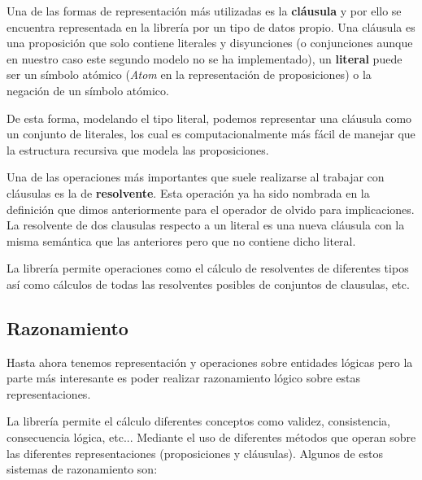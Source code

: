 	Una de las formas de representación más utilizadas es la \textbf{cláusula} y por ello se encuentra representada en la librería por un tipo de datos propio. Una cláusula es una proposición que solo contiene literales y disyunciones (o conjunciones aunque en nuestro caso este segundo modelo no se ha implementado), un \textbf{literal} puede ser un símbolo atómico (\textit{Atom} en la representación de proposiciones) o la negación de un símbolo atómico.
	
	De esta forma, modelando el tipo literal, podemos representar una cláusula como un conjunto de literales, los cual es computacionalmente más fácil de manejar que la estructura recursiva que modela las proposiciones.
	
	Una de las operaciones más importantes que suele realizarse al trabajar con cláusulas es la de \textbf{resolvente}. Esta operación ya ha sido nombrada en la definición que dimos anteriormente para el operador de olvido para implicaciones. La resolvente de dos clausulas respecto a un literal es una nueva cláusula con la misma semántica que las anteriores pero que no contiene dicho literal. 
	
	La librería permite operaciones como el cálculo de resolventes de diferentes tipos así como cálculos de todas las resolventes posibles de conjuntos de clausulas, etc.
	

\subsection*{Razonamiento}

	Hasta ahora tenemos representación y operaciones sobre entidades lógicas pero la parte más interesante es poder realizar razonamiento lógico sobre estas representaciones.	
	
	La librería permite el cálculo diferentes conceptos como validez, consistencia, consecuencia lógica, etc... Mediante el uso de diferentes métodos que operan sobre las diferentes representaciones (proposiciones y cláusulas). Algunos de estos sistemas de razonamiento son:
	
